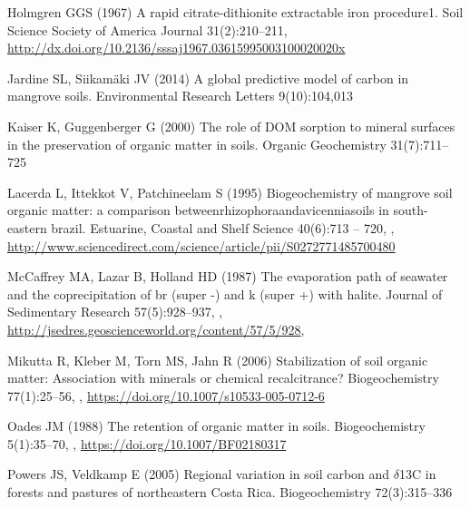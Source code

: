 \begin{thebibliography}{24}
Holmgren GGS (1967) A rapid citrate-dithionite extractable iron procedure1.
  Soil Science Society of America Journal 31(2):210--211,
  \urlprefix\url{http://dx.doi.org/10.2136/sssaj1967.03615995003100020020x}

Jardine SL, Siikam\"aki JV (2014) A global predictive model of carbon in
  mangrove soils. Environmental Research Letters 9(10):104,013

Kaiser K, Guggenberger G (2000) {The role of DOM sorption to mineral surfaces
  in the preservation of organic matter in soils}. Organic Geochemistry
  31(7):711--725

Lacerda L, Ittekkot V, Patchineelam S (1995) Biogeochemistry of mangrove soil
  organic matter: a comparison betweenrhizophoraandavicenniasoils in
  south-eastern brazil. Estuarine, Coastal and Shelf Science 40(6):713 -- 720,
  ,
  \urlprefix\url{http://www.sciencedirect.com/science/article/pii/S0272771485700480}

McCaffrey MA, Lazar B, Holland HD (1987) The evaporation path of seawater and
  the coprecipitation of br (super -) and k (super +) with halite. Journal of
  Sedimentary Research 57(5):928--937,
  ,
  \urlprefix\url{http://jsedres.geoscienceworld.org/content/57/5/928},

Mikutta R, Kleber M, Torn MS, Jahn R (2006) Stabilization of soil organic
  matter: Association with minerals or chemical recalcitrance? Biogeochemistry
  77(1):25--56, ,
  \urlprefix\url{https://doi.org/10.1007/s10533-005-0712-6}

Oades JM (1988) The retention of organic matter in soils. Biogeochemistry
  5(1):35--70, ,
  \urlprefix\url{https://doi.org/10.1007/BF02180317}

Powers JS, Veldkamp E (2005) {Regional variation in soil carbon and $\delta$13C
  in forests and pastures of northeastern Costa Rica}. Biogeochemistry
  72(3):315--336


\end{thebibliography}
